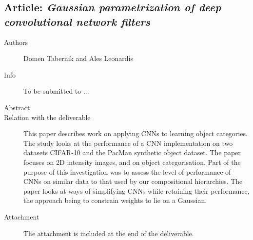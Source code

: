 \documentclass[a4paper,11pt,pdf]{pacmanreport}
\begin{document}
\subsection{Article: \em Gaussian parametrization of deep convolutional network filters}
\begin{description}
    \item[Authors] Domen Tabernik and Ales Leonardis
    \item[Info] To be submitted to ...%
    \item[Abstract]
    \item [Relation with the deliverable] This paper describes work on applying CNNs to learning object categories. The study looks at the performance of a CNN implementation on two datasets CIFAR-10 and the PacMan synthetic object dataset. The paper focuses on 2D intensity images, and on object categorisation. Part of the purpose of this investigation was to assess the level of performance of CNNs on similar data to that used by our compositional hierarchies. The paper looks at ways of simplifying CNNs while retaining their performance, the approach being to constrain weights to lie on a Gaussian. 
    \item[Attachment] The attachment is included at the end of the deliverable. %
\end{description}
\newpage
\end{document}
